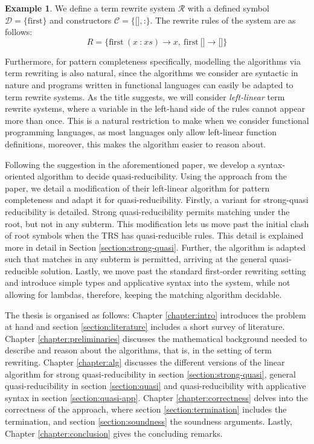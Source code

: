 \documentclass{report}
\theoremstyle{definition}
\newtheorem{example_inner}{Example}
\newenvironment{example}
  {\begin{customblock}\begin{example_inner}}
  {\end{example_inner}\end{customblock}}
\begin{document}
\begin{example}\label{example:trs-first}
We define a term rewrite system $\mathcal{R}$ with a defined symbol $\mathcal{D} = \{\text{first}\}$ and constructors $\mathcal{C} = \{\texttt{[]}, \texttt{:}\}$. The rewrite rules of the system are as follows:
$$R = \{\text{first}\ (x\ \texttt{:}\ xs) \to x,\ \text{first}\ \texttt{[]} \to \texttt{[]}\}$$
\end{example}

Furthermore, for pattern completeness specifically, modelling the algorithms via term rewriting is also natural, since the algorithms we consider are syntactic in nature and programs written in functional languages can easily be adapted to term rewrite systems. As the title suggests, we will consider \textit{left-linear} term rewrite systems, where a variable in the left-hand side of the rules cannot appear more than once. This is a natural restriction to make when we consider functional programming languages, as most languages only allow left-linear function definitions, moreover, this makes the algorithm easier to reason about.

Following the suggestion in the aforementioned paper, we develop a syntax-oriented algorithm to decide quasi-reducibility. Using the approach from the paper, we detail a modification of their left-linear algorithm for pattern completeness and adapt it for quasi-reducibility. Firstly, a variant for strong-quasi reducibility is detailed. Strong quasi-reducibility permits matching under the root, but not in any subterm. This modification lets us move past the initial clash of root symbols when the TRS has quasi-reducible rules. This detail is explained more in detail in Section \ref{section:strong-quasi}. Further, the algorithm is adapted such that matches in any subterm is permitted, arriving at the general quasi-reducible solution. Lastly, we move past the standard first-order rewriting setting and introduce simple types and applicative syntax into the system, while not allowing for lambdas, therefore, keeping the matching algorithm decidable.

The thesis is organised as follows: Chapter \ref{chapter:intro} introduces the problem at hand and section \ref{section:literature} includes a short survey of literature. Chapter \ref{chapter:preliminaries} discusses the mathematical background needed to describe and reason about the algorithms, that is, in the setting of term rewriting. Chapter \ref{chapter:alg} discusses the different versions of the linear algorithm for strong quasi-reducibility in section \ref{section:strong-quasi}, general quasi-reducibility in section \ref{section:quasi} and quasi-reducibility with applicative syntax in section \ref{section:quasi-app}. Chapter \ref{chapter:correctness} delves into the correctness of the approach, where section \ref{section:termination} includes the termination, and section \ref{section:soundness} the soundness arguments. Lastly, Chapter \ref{chapter:conclusion} gives the concluding remarks.
\end{document}
